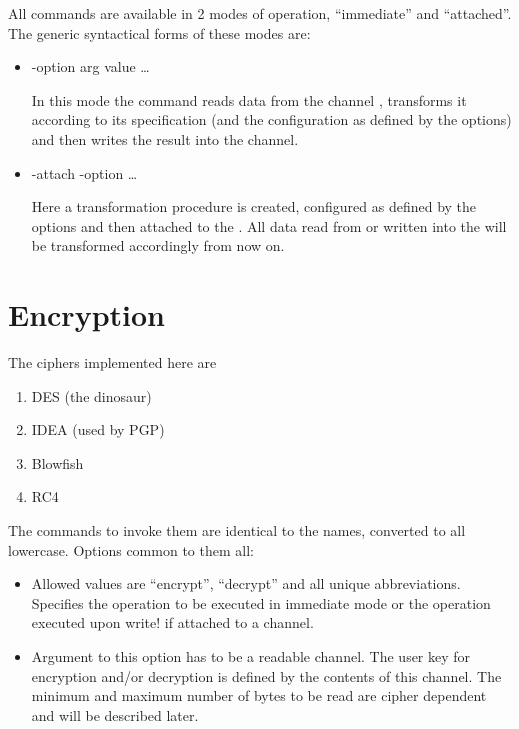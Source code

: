 All commands are available in 2 modes of operation, ``immediate'' and
``attached''. The generic syntactical forms of these modes are:

\begin {itemize}
\item[immediate:]	 -option arg {value} \dots{}  

			In this mode the command reads data from the
			channel , transforms it according
			to its specification (and the configuration as
			defined by the options) and then writes the
			result into the  channel.

\item[attached:]	 -attach  -option  \dots{}

			Here a transformation procedure is created,
			configured as defined by the options and then
			attached to the . All data read
			from or written into the  will
			be transformed accordingly from now on.
\end   {itemize}


\section {Encryption}

The ciphers implemented here are

\begin {enumerate}
\item	DES 	(the dinosaur)
\item	IDEA	(used by PGP)
\item	Blowfish
\item	RC4
\end   {enumerate}

The commands to invoke them are identical to the names, converted to
all lowercase. Options common to them all:

\begin {itemize}
\item [-direction]	Allowed values are ``encrypt'', ``decrypt'' and all
			unique abbreviations. Specifies the operation
			to be executed in immediate mode or the
			operation executed upon write! if attached to
			a channel.
\item [-key]		Argument to this option has to be a readable
			channel. The user key for encryption and/or
			decryption is defined by the contents of this
			channel. The minimum and maximum number of
			bytes to be read are cipher dependent and will
			be described later.
\end   {itemize}

